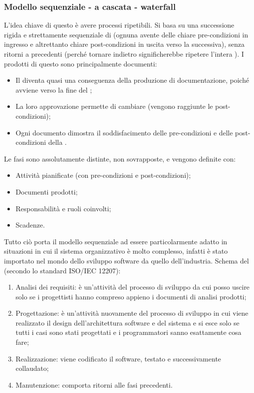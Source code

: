 \documentclass[../main]{subfiles}
\begin{document}
\subsubsection{Modello sequenziale - a cascata - waterfall}
L'idea chiave di questo  è avere processi ripetibili.\newline
Si basa su una successione rigida e strettamente sequenziale di  (ognuna avente delle chiare pre-condizioni in ingresso e altrettanto chiare post-condizioni in uscita verso la  successiva), senza ritorni a  precedenti (perché tornare indietro significherebbe ripetere l'intera ).\newline
I prodotti di questo  sono principalmente documenti:
\begin{itemize}
    \item Il  diventa quasi una conseguenza della produzione di documentazione, poiché avviene verso la fine del ;
    \item La loro approvazione permette di cambiare  (vengono raggiunte le post-condizioni);
    \item Ogni documento dimostra il soddisfacimento delle pre-condizioni e delle post-condizioni della .
\end{itemize}
Le fasi sono assolutamente distinte, non sovrapposte, e vengono definite con:
\begin{itemize}
    \item Attività pianificate (con pre-condizioni e post-condizioni);
    \item Documenti prodotti;
    \item Responsabilità e ruoli coinvolti;
    \item Scadenze.
\end{itemize}
Tutto ciò porta il modello sequenziale ad essere particolarmente adatto in situazioni in cui il sistema organizzativo è molto complesso, infatti è stato importato nel mondo dello sviluppo software da quello dell'industria.\newline
Schema del  (secondo lo standard ISO/IEC 12207):
\begin{enumerate}
    \item Analisi dei requisiti: è un'attività del processo di sviluppo da cui posso uscire solo se i progettisti hanno compreso appieno i documenti di analisi prodotti;
    \item Progettazione: è un'attività nuovamente del processo di sviluppo in cui viene realizzato il design dell'architettura software e del sistema e si esce solo se tutti i casi sono stati progettati e i programmatori sanno esattamente cosa fare;
    \item Realizzazione: viene codificato il software, testato e successivamente collaudato;
    \item Manutenzione: comporta ritorni alle fasi precedenti.
\end{enumerate}
\end{document}
